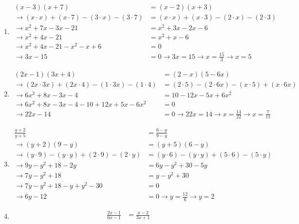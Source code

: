 \begin{enumerate}[label=\alph*)]
  \item \begin{align*}
      (x-3)(x+7) &= (x-2)(x+3)\\
      \rightarrow (x \cdot x) + (x \cdot 7) - (3 \cdot x) - (3 \cdot 7) &= (x \cdot x) + (x \cdot 3) - (2 \cdot x) - (2 \cdot 3)\\
      \rightarrow x^2 + 7x - 3x - 21 &= x^2 + 3x - 2x - 6\\
      \rightarrow x^2 + 4x - 21 &= x^2 + x - 6\\
      \rightarrow x^2 + 4x - 21 - x^2 - x + 6 &= 0\\
      \rightarrow 3x - 15 &= 0 \rightarrow 3x = 15 \rightarrow x = \frac{15}{3} \rightarrow x = 5
    \end{align*}
  \item \begin{align*}
      (2x-1)(3x+4) &= (2-x)(5-6x)\\
      \rightarrow (2x \cdot 3x) + (2x \cdot 4) - (1 \cdot 3x) - (1 \cdot 4) &= (2 \cdot 5) - (2 \cdot 6x) - (x \cdot 5) + (x \cdot 6x)\\
      \rightarrow 6x^2 + 8x - 3x - 4 &= 10 - 12x - 5x + 6x^2\\
      \rightarrow 6x^2 + 8x - 3x - 4 - 10 + 12x + 5x - 6x^2 &= 0\\
      \rightarrow 22x - 14 &= 0 \rightarrow 22x = 14 \rightarrow x = \frac{14}{22} \rightarrow x = \frac{7}{11}
    \end{align*}
  \item \begin{align*}
      \frac{y+2}{y+5} &= \frac{6-y}{9-y}\\
      \rightarrow (y+2)(9-y) &= (y+5)(6-y)\\
      \rightarrow (y \cdot 9) - (y \cdot y) + (2 \cdot 9) - (2 \cdot y) &= (y \cdot 6) - (y \cdot y) + (5 \cdot 6) - (5 \cdot y)\\
      \rightarrow 9y - y^2 + 18 - 2y &= 6y - y^2 + 30 - 5y\\
      \rightarrow 7y - y^2 + 18 &= y - y^2 + 30\\
      \rightarrow 7y - y^2 + 18 - y + y^2 - 30 &= 0\\
      \rightarrow 6y - 12 &= 0 \rightarrow y = \frac{12}{6} \rightarrow y = 2
    \end{align*}
  \item \begin{align*}
      \frac{2x-1}{6x-1} &= \frac{x-2}{3x+1}\\

\end{align*}
\end{enumerate}
